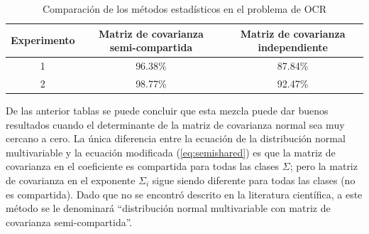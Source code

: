 \documentclass[a4paper, 11pt, oneside]{report}
\begin{document}
\begin{table}
\begin{center}
\begin{tabular}{|c|c|c|} 
\hline
Experimento & Matriz de covarianza semi-compartida & Matriz de covarianza independiente \\
\hline
1 & 96.38\% & 87.84\% \\
2 & 98.77\% & 92.47\% \\
\hline 
\end{tabular}
\end{center}
\caption{Comparación de los métodos estadísticos en el problema de OCR} 
\label{tb:classifResult}
\end{table}
De las anterior tablas se puede concluir que esta mezcla puede dar buenos resultados cuando el determinante de la matriz de covarianza normal sea muy cercano a cero. La única diferencia entre la ecuación de la distribución normal multivariable y la ecuación modificada (\ref{eq:semishared}) es que la matriz de covarianza en el coeficiente es compartida para todas las clases $\Sigma$; pero la matriz de covarianza en el exponente $\Sigma_i$ sigue siendo diferente para todas las clases (no es compartida).
Dado que no se encontró descrito en la literatura científica, a este método se le denominará ``distribución normal multivariable con matriz de covarianza semi-compartida''.
\end{document}

